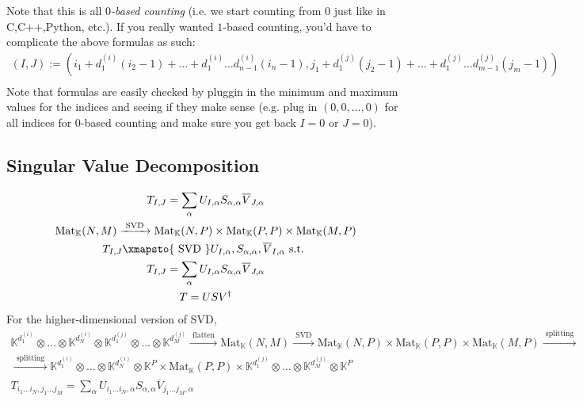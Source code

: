 \documentclass[10pt]{amsart}
\begin{document}
\begin{multicols*}{2}
\[\]
Note that this is all \emph{$0$-based counting} (i.e. we start counting from $0$ just like in C,C++,Python, etc.).  If you really wanted $1$-based counting, you'd have to complicate the above formulas as such:
\[
\begin{gathered}
(I,J) := (i_1 + d_1^{(i)} (i_2-1) + \dots + d_1^{(i)} \dots d_{n-1}^{(i)} (i_n-1) ,j_1 + d_1^{(j)} (j_2-1) + \dots + d_1^{(j)} \dots d_{m-1}^{(j)} (j_m-1) ) \\ 
\end{gathered}
\]
Note that formulas are easily checked by pluggin in the minimum and maximum values for the indices and seeing if they make sense (e.g. plug in $(0,0,\dots ,0)$ for all indices for $0$-based counting and make sure you get back $I=0$ or $J=0$).  

\subsection{Singular Value Decomposition}  

\begin{equation}
\begin{gathered}
	T_{I,J} = \sum_{\alpha} U_{I,\alpha} S_{\alpha,\alpha} \overline{V}_{J,\alpha} \\ 
 \text{Mat}_{\mathbb{K}}(N,M) \xrightarrow{ \text{ SVD } } \text{Mat}_{\mathbb{K}}(N,P) \times \text{Mat}_{\mathbb{K}}(P,P) \times \text{Mat}_{\mathbb{K}}(M,P)    \\
	T_{I,J} \xmapsto{ \text{ SVD } } U_{I,\alpha}, S_{\alpha,\alpha} , \overline{V}_{I,\alpha} \text{ s.t. } \\
T_{I,J} = \sum_{\alpha} U_{I,\alpha} S_{\alpha, \alpha} \overline{V}_{J,\alpha}    \\
T=USV^{\dag}
\end{gathered}
\end{equation}
For the higher-dimensional version of SVD, 
\begin{equation}
\begin{gathered}
	\mathbb{K}^{d_1^{(i)} } \otimes \dots \otimes \mathbb{K}^{d^{(i)}_N} \otimes \mathbb{K}^{d_1^{(j)} }\otimes \dots \otimes \mathbb{K}^{d_M^{(j)} }  \xrightarrow{ \text{ flatten } } \text{Mat}_{\mathbb{K}}(N,M) \xrightarrow{ \text{ SVD } }     \text{Mat}_{\mathbb{K}}(N,P) \times \text{Mat}_{\mathbb{K}}(P,P) \times \text{Mat}_{\mathbb{K}}(M,P) \xrightarrow{ \text{ splitting } } \\ 
\xrightarrow{ \text{ splitting } } \mathbb{K}^{d_1^{(i)} } \otimes \dots \otimes \mathbb{K}^{d^{(i)}_N} \otimes \mathbb{K}^P \times \text{Mat}_{\mathbb{K}}(P,P) \times  \mathbb{K}^{d_1^{(j)} }\otimes \dots \otimes \mathbb{K}^{d_M^{(j)} } \otimes \mathbb{K}^P  \\
T_{i_1\dots i_N,j_1 \dots j_M} = \sum_{\alpha} U_{i_1\dots i_N,\alpha} S_{\alpha,\alpha} \overline{V}_{j_1 \dots j_M, \alpha}
\end{gathered}
\end{equation}


\end{multicols*}
\end{document}
